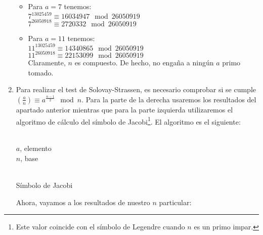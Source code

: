 \begin{enumerate}
\begin{itemize}
			\item Para $a = 7$ tenemos:\\
				$7^{13025459} \equiv 16034947 \mod 26050919$\\
				$7^{26050918} \equiv 2720332 \mod 26050919$\\
				
			\item Para $a = 11$ tenemos:\\
				$11^{13025459} \equiv 14340865 \mod 26050919$\\
				$11^{26050918} \equiv 22153099 \mod 26050919$\\
				
			Claramente, $n$ es compuesto. De hecho, no engaña a ningún $a$ primo tomado.
		\end{itemize}
		
		\item Para realizar el test de Solovay-Strassen, es necesario comprobar si se cumple $\displaystyle \left(
		\frac{a}{n} \right) \equiv a^{\frac{n-1}{2}} \mod n$. Para la parte de la derecha usaremos los resultados del
		apartado anterior mientras que para la parte izquierda utilizaremos el algoritmo de cálculo del símbolo
		de Jacobi\footnote{Este valor coincide con el símbolo de Legendre cuando $n$ es un primo impar.}. El
		algoritmo es el siguiente:
		\begin{algorithm}[H]
			\begin{algorithmic}[1]
				\REQUIRE \ \\
					\texttt{$a$}, elemento \\
					\texttt{$n$}, base \\ \
						\ENDIF
					\ENDWHILE
					\ENDIF
				\ENDWHILE
				\ELSE
				\ENDIF
			\end{algorithmic}
			\caption{Símbolo de Jacobi}
			\label{Jac-symbol}
		\end{algorithm}
		
		Ahora, vayamos a los resultados de nuestro $n$ particular:
		

\end{enumerate}
